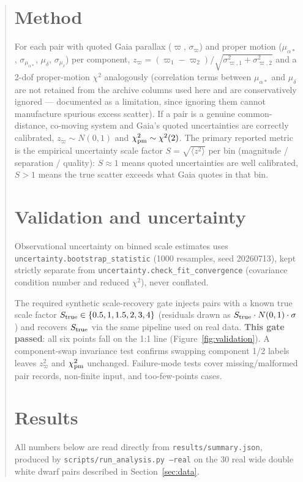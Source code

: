 \documentclass[11pt]{article}
\begin{document}
\begin{abstract}
\section{Method}
For each pair with quoted Gaia parallax ($\varpi$, $\sigma_\varpi$) and
proper motion ($\mu_{\alpha*}$, $\sigma_{\mu_{\alpha*}}$, $\mu_\delta$,
$\sigma_{\mu_\delta}$) per component,
$z_\varpi = (\varpi_1-\varpi_2)/\sqrt{\sigma_{\varpi,1}^2+\sigma_{\varpi,2}^2}$
and a 2-dof proper-motion $\chi^2$ analogously (correlation terms between
$\mu_{\alpha*}$ and $\mu_\delta$ are not retained from the archive columns
used here and are conservatively ignored --- documented as a limitation,
since ignoring them cannot manufacture spurious excess scatter). If a pair is
a genuine common-distance, co-moving system and Gaia's quoted uncertainties
are correctly calibrated, $z_\varpi \sim N(0,1)$ and $\chi^2_{\rm pm} \sim
\chi^2(2)$. The primary reported metric is the empirical uncertainty scale
factor $S = \sqrt{\langle z^2 \rangle}$ per bin (magnitude / separation /
quality): $S \approx 1$ means quoted uncertainties are well calibrated,
$S > 1$ means the true scatter exceeds what Gaia quotes in that bin.

\section{Validation and uncertainty}
\label{sec:validation}
Observational uncertainty on binned scale estimates uses
\texttt{uncertainty.bootstrap\_statistic} (1000 resamples, seed 20260713),
kept strictly separate from \texttt{uncertainty.check\_fit\_convergence}
(covariance condition number and reduced $\chi^2$), never conflated.

The required synthetic scale-recovery gate injects pairs with a known true
scale factor $S_{\rm true} \in \{0.5, 1, 1.5, 2, 3, 4\}$ (residuals drawn as
$S_{\rm true} \cdot N(0,1) \cdot \sigma$) and recovers $S_{\rm true}$ via the
same pipeline used on real data. \textbf{This gate passed}: all six points
fall on the 1:1 line (Figure~\ref{fig:validation}). A component-swap
invariance test confirms swapping component 1/2 labels leaves $z_\varpi^2$
and $\chi^2_{\rm pm}$ unchanged. Failure-mode tests cover missing/malformed
pair records, non-finite input, and too-few-points cases.

\section{Results}
\label{sec:results}
All numbers below are read directly from \texttt{results/summary.json},
produced by \texttt{scripts/run\_analysis.py --real} on the 30 real wide
double white dwarf pairs described in Section~\ref{sec:data}.


\end{abstract}
\end{document}
